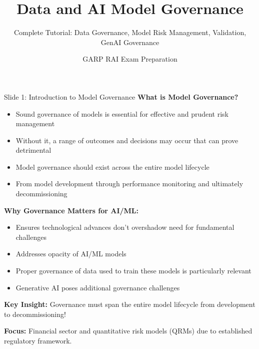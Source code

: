 \documentclass[8pt]{beamer}
\title{Data and AI Model Governance}
\subtitle{Complete Tutorial: Data Governance, Model Risk Management, Validation, GenAI Governance}
\author{GARP RAI Exam Preparation}
\date{}
\begin{document}
	
	\begin{frame}
		\titlepage
	\end{frame}
	
	
	\begin{frame}{Slide 1: Introduction to Model Governance}
		\fontsize{6.5}{7.5}\selectfont
		\textbf{What is Model Governance?}
		
		\begin{itemize}
			\item Sound governance of models is essential for effective and prudent risk management
			\item Without it, a range of outcomes and decisions may occur that can prove detrimental
			\item Model governance should exist across the entire model lifecycle
			\item From model development through performance monitoring and ultimately decommissioning
		\end{itemize}
		
		\vspace{0.1cm}
		\textbf{Why Governance Matters for AI/ML:}
		\begin{itemize}
			\item Ensures technological advances don't overshadow need for fundamental challenges
			\item Addresses opacity of AI/ML models
			\item Proper governance of data used to train these models is particularly relevant
			\item Generative AI poses additional governance challenges
		\end{itemize}
		
		\vspace{0.1cm}
		\textbf{Key Insight:} Governance must span \textcolor{myblue}{the entire model lifecycle} from development to decommissioning!
		
		\textcolor{myblue}{\textbf{Focus:}} Financial sector and quantitative risk models (QRMs) due to established regulatory framework.
	\end{frame}
	
\end{document}
